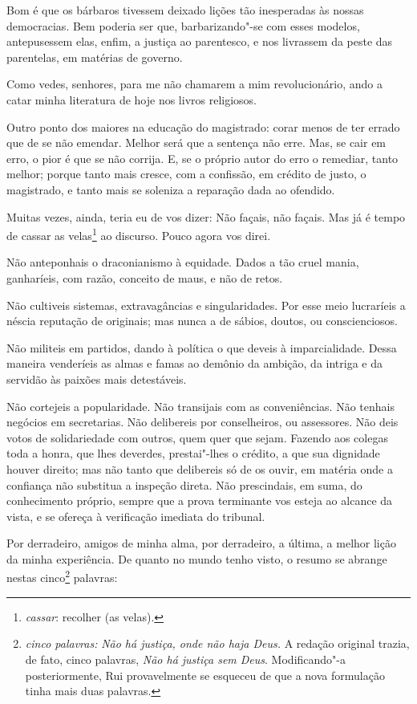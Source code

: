 Bom é que os bárbaros tivessem deixado lições tão inesperadas às
nossas democracias. Bem poderia ser que, barbarizando"-se com esses
modelos, antepusessem elas, enfim, a justiça ao parentesco, e nos
livrassem da peste das parentelas, em matérias de governo.

Como vedes, senhores, para me não chamarem a mim revolucionário,
ando a catar minha literatura de hoje nos livros religiosos.

Outro ponto dos maiores na educação do magistrado: corar menos de
ter errado que de se não emendar. Melhor será que a sentença não erre.
Mas, se cair em erro, o pior é que se não corrija. E, se o próprio
autor do erro o remediar, tanto melhor; porque tanto mais cresce, com a
confissão, em crédito de justo, o magistrado, e tanto mais se soleniza
a reparação dada ao ofendido.

Muitas vezes, ainda, teria eu de vos dizer: Não façais, não
façais. Mas já é tempo de cassar as velas\footnote{\textit{cassar}: recolher (as velas).} ao discurso. Pouco agora vos direi.

Não anteponhais o draconianismo à equidade. Dados a tão cruel
mania, ganharíeis, com razão, conceito de maus, e não de retos.

Não cultiveis sistemas, extravagâncias e singularidades. Por esse
meio lucraríeis a néscia reputação de originais; mas nunca a de sábios,
doutos, ou conscienciosos.

Não militeis em partidos, dando à política o que deveis à
imparcialidade. Dessa maneira venderíeis as almas e famas ao demônio da
ambição, da intriga e da servidão às paixões mais detestáveis.

Não cortejeis a popularidade. Não transijais com as conveniências.
Não tenhais negócios em secretarias. Não delibereis por conselheiros,
ou assessores. Não deis votos de solidariedade com outros, quem quer
que sejam. Fazendo aos colegas toda a honra, que lhes deverdes,
prestai"-lhes o crédito, a que sua dignidade houver direito; mas não
tanto que delibereis só de os ouvir, em matéria onde a confiança não
substitua a inspeção direta. Não prescindais, em suma, do conhecimento
próprio, sempre que a prova terminante vos esteja ao alcance da vista,
e se ofereça à verificação imediata do tribunal.

Por derradeiro, amigos de minha alma, por derradeiro, a última, a
melhor lição da minha experiência. De quanto no mundo tenho visto, o
resumo se abrange nestas cinco\footnote{\emph{cinco palavras:} \textit{Não há
justiça, onde não haja Deus.} A redação original trazia, de fato, cinco palavras, \emph{Não há justiça sem Deus}. Modificando"-a posteriormente, Rui provavelmente se esqueceu de que a nova formulação tinha mais duas palavras.} palavras:

